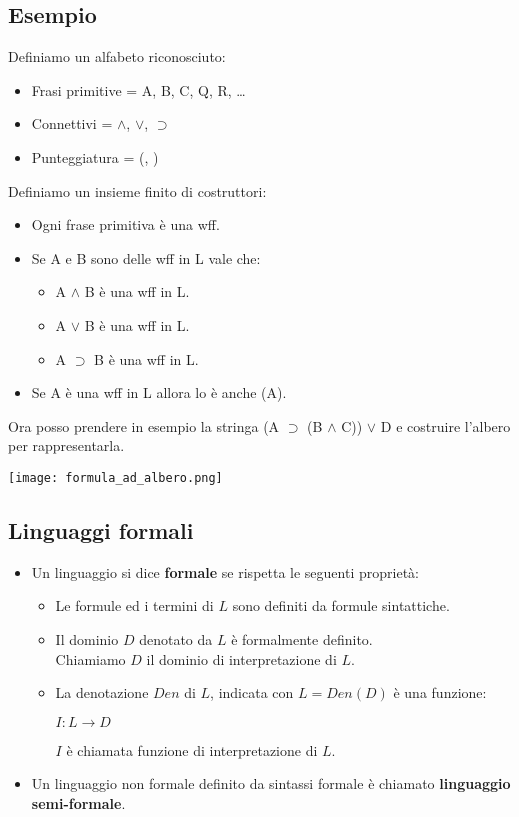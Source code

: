 \documentclass[../main.tex]{subfiles}
\begin{document}
    \subsection{Esempio}
    Definiamo un alfabeto riconosciuto:
    \begin{itemize}
        \item Frasi primitive = A, B, C, Q, R, \dots
        \item Connettivi = $\land$, $\lor$, $\supset$
        \item Punteggiatura = (, )
    \end{itemize}
    Definiamo un insieme finito di costruttori:
    \begin{itemize}
        \item Ogni frase primitiva è una wff.
        \item Se A e B sono delle wff in L vale che:
        \begin{itemize}
            \item A $\land$ B è una wff in L.
            \item A $\lor$ B è una wff in L.
            \item A $\supset$ B è una wff in L.
        \end{itemize}
        \item Se A è una wff in L allora lo è anche (A).
    \end{itemize}
    Ora posso prendere in esempio la stringa (A $\supset$ (B $\land$ C)) $\lor$ D e costruire l'albero per rappresentarla.
    \begin{center}
        \texttt{[image: formula\_ad\_albero.png]}
    \end{center}

    \subsection{Linguaggi formali}
    \begin{itemize}
        \item Un linguaggio si dice \textbf{formale} se rispetta le seguenti proprietà:
        \begin{itemize}
            \item Le formule ed i termini di $L$ sono definiti da formule sintattiche.
            \item Il dominio $D$ denotato da $L$ è formalmente definito.\\
                Chiamiamo $D$ il dominio di interpretazione di $L$.
            \item La denotazione $Den$ di $L$, indicata con $L=Den(D)$ è una funzione:
            \begin{center}
                $I:L \to D$
            \end{center}
            $I$ è chiamata funzione di interpretazione di $L$.
        \end{itemize}
        \item Un linguaggio non formale definito da sintassi formale è chiamato \textbf{linguaggio semi-formale}.
    \end{itemize}
\end{document}
